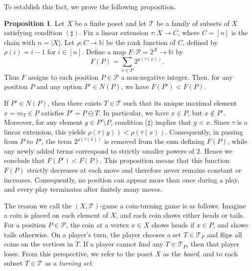 \documentclass[a4paper,11pt]{amsart}
\theoremstyle{definition}
\newtheorem{prop}{Proposition}[section]
\newenvironment{demo}[1]{%
  \trivlist
  \item[\hskip\labelsep
        {\bf #1.}]
}{%
\hfill\qedsymbol
  \endtrivlist
}
\numberwithin{equation}{section}
\def\Non{\mathbb{N}}
\def\P{\mathcal{P}}
\def\T{\mathscr{T}}
\begin{document}
To establish this fact, we prove the following proposition.
%
\begin{prop}
%
Let $X$ be a finite poset and let $\T$ be a family of subsets of $X$ satisfying condition $(\sharp)$.
Fix a linear extension $\tau: X \to C$, where $C=[n]$ is the chain with $n=|X|$.
Let $\rho:C\to \Non$ be the rank function of $C$,
defined by $\rho(i)=i-1$  for $i\in[n]$.
Define a map $F:\P=2^X\to \Non$ by
%
\[
F(P)=\sum_{x\in P}2^{\rho(\tau(x))}.
\]
%
Thus $F$ assigns to each position $P\in\P$ a non-negative integer.
Then,
for any position $P$ and any option $P'\in N(P)$, we have $F(P')<F(P)$.
%
\end{prop}
%
\begin{demo}{Proof}
If $P'\in N(P)$, then there exists $T\in\T$ such that its unique maximal element $x=m_{T}\in P$ satisfies $P'=P\ominus T$.
In particular, we have $x\in P$, but $x\not\in P'$.
Moreover, for any element $y\in P'\setminus P$,
condition ($\sharp$) implies that $y<x$.
Since $\tau$ is a linear extension, this yields $\rho(\tau(y))<\rho(\tau(x))$.
Consequently, in passing from $P$ to $P'$,
the term $2^{\rho(\tau(x))}$ is removed from the sum defining $F(P)$,
while any newly added terms correspond to strictly smaller powers of $2$.
Hence we conclude that $F(P')<F(P)$.
\end{demo}
%
This proposition means that this function $F(P)$ strictly decreases at each move and therefore never remains constant or increases.
Consequently, no position can appear more than once during a play, and every play terminates after finitely many moves.
%
\par\smallskip
%
The reason we call the $(X,\T)$-game a coin-turning game is as follows.
Imagine a coin is placed on each element of $X$, and each coin shows either heads or tails.
For a position $P\in\P$, the coin at a vertex $x\in X$ shows heads if $x\in P$, and shows tails otherwise.
On a player's turn, the player chooses a set $T \in \T_{P}$ 
and flips all coins on the vertices in $T$.
If a player cannot find any $T \in \T_{P}$, then that player loses.
From this perspective, we refer to the poset $X$ as the \textsl{board}, and to each subset 
$T \in \T$ as a \textsl{turning set}.
%
%
%
\end{document}
